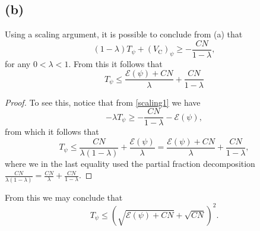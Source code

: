 \documentclass[a4paper,11pt]{article}
\numberwithin{equation}{section}
\begin{document}
 \subsection*{(b)}
 Using a scaling argument, it is possible to conclude from (a) that \begin{equation}
 (1-\lambda)T_\psi+(V_\text{C})_\psi\geq-\frac{CN}{1-\lambda},\label{scaling1}
 \end{equation}
 for any $ 0<\lambda<1 $. From this it follows that \begin{equation}
 T_\psi\leq\frac{\mathcal{E}(\psi)+CN}{\lambda}+\frac{CN}{1-\lambda} \label{ineq1}
 \end{equation}
 \begin{proof}
 	To see this, notice that from \eqref{scaling1} we have \begin{equation}
 	-\lambda T_\psi\geq-\frac{CN}{1-\lambda}-\mathcal{E}(\psi),
 	\end{equation}
 	from which it follows that\begin{equation}
 	T_\psi\leq \frac{CN}{\lambda(1-\lambda)}+\frac{\mathcal{E}(\psi)}{\lambda}=\frac{\mathcal{E}(\psi)+CN}{\lambda}+\frac{CN}{1-\lambda},
 	\end{equation}
 	where we in the last equality used the partial fraction decomposition $ \frac{CN}{\lambda(1-\lambda)}=\frac{CN}{\lambda}+\frac{CN}{1-\lambda} $.
 \end{proof}
 	From this we may conclude that \begin{equation}
 	T_\psi\leq(\sqrt{\mathcal{E}(\psi)+CN}+\sqrt{CN})^2.
 	\end{equation}
\end{document}
